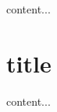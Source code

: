 \documentclass{beamer}
\begin{document}
\begin{frame}
content...
\end{frame}

\section{title}

\begin{frame}
content...
\end{frame}
\end{document}
